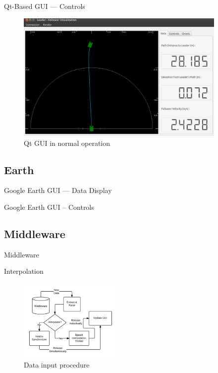 \documentclass{beamer}
\begin{document}
    \begin{frame}{Qt-Based GUI --- Controls}
      \begin{figure}[ht] \centering
        \includegraphics[width=4in] {../graphics/final_design_data.png}
        \caption{Qt GUI in normal operation} \label{fig:qt_controls}
      \end{figure}
    \end{frame}

  \subsection{Earth}

    \begin{frame}{Google Earth GUI --- Data Display}
    \end{frame}

    \begin{frame}{Google Earth GUI -- Controls}
    \end{frame}

  \subsection{Middleware}

    \begin{frame}{Middleware}
    \end{frame}

    \begin{frame}{Interpolation}
      \begin{figure}[ht] \centering
        \includegraphics[width=5cm] {../graphics/middleware_diagram.png}
        \caption{Data input procedure} \label{fig:mw_diagram}
      \end{figure}
    \end{frame}
\end{document}
